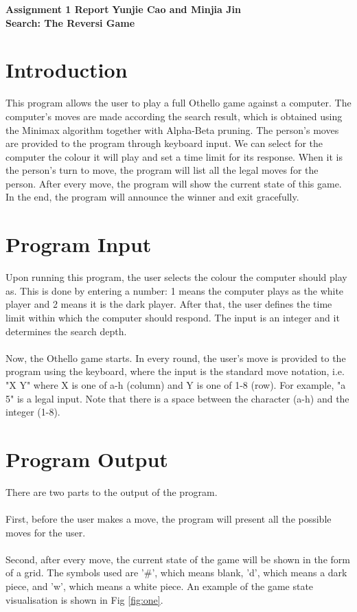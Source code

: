 \documentclass[a4paper, 11pt]{article}
\begin{document}
\noindent
\large\textbf{Assignment 1 Report} \hfill \textbf{Yunjie Cao and Minjia Jin}\\

\large\textbf{Search: The Reversi Game}

\section*{Introduction}
This program allows the user to play a full Othello game against a computer. The computer's moves are made according the search result, which is obtained using the Minimax algorithm together with Alpha-Beta pruning. The person's moves are provided to the program through keyboard input. We can select for the computer the colour it will play and set a time limit for its response. When it is the person's turn to move, the program will list all the legal moves for the person. After every move, the program will show the current state of this game. In the end, the program will announce the winner and exit gracefully.

\section*{Program Input}
Upon running this program, the user selects the colour the computer should play as. This is done by entering a number: 1 means the computer plays as the white player and 2 means it is the dark player. After that, the user defines the time limit within which the computer should respond. The input is an integer and it determines the search depth.
\\
\\
Now, the Othello game starts. In every round, the user's move is provided to the program using the keyboard, where the input is the standard move notation, i.e. "X Y" where X is one of a-h (column) and Y is one of 1-8 (row). For example, "a 5" is a legal input. Note that there is a space between the character (a-h) and the integer (1-8).

\section*{Program Output}
There are two parts to the output of the program.
\\
\\
First, before the user makes a move, the program will present all the possible moves for the user.
\\\\
Second, after every move, the current state of the game will be shown in the form of a grid. The symbols used are '\#', which means blank, 'd', which means a dark piece, and 'w', which means a white piece. An example of the game state visualisation is shown in Fig \ref{fig:one}.
\end{document}
